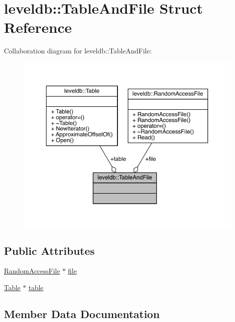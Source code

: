 \hypertarget{structleveldb_1_1_table_and_file}{}\section{leveldb\+::Table\+And\+File Struct Reference}
\label{structleveldb_1_1_table_and_file}


Collaboration diagram for leveldb\+::Table\+And\+File\+:
\nopagebreak
\begin{figure}[H]
\begin{center}
\leavevmode
\includegraphics[width=350pt]{structleveldb_1_1_table_and_file__coll__graph}
\end{center}
\end{figure}
\subsection*{Public Attributes}
\begin{DoxyCompactItemize}
\item 
\mbox{\hyperlink{classleveldb_1_1_random_access_file}{Random\+Access\+File}} $\ast$ \mbox{\hyperlink{structleveldb_1_1_table_and_file_a7f1f72d4654e4ab49aab750330036edb}{file}}
\item 
\mbox{\hyperlink{classleveldb_1_1_table}{Table}} $\ast$ \mbox{\hyperlink{structleveldb_1_1_table_and_file_ab2df8b8a6c028cfcf36885fe76f48c99}{table}}
\end{DoxyCompactItemize}


\subsection{Member Data Documentation}
\mbox{\label{structleveldb_1_1_table_and_file_a7f1f72d4654e4ab49aab750330036edb}} 
